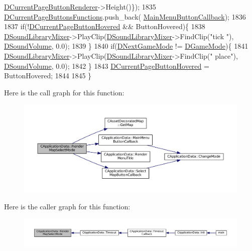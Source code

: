 \begin{DoxyCode}
      \hyperlink{classCApplicationData_abfe1743f2634b069ccc811db4a8733a8}{DCurrentPageButtonRenderer}->Height()\});
1835     \hyperlink{classCApplicationData_ad3079e5563a19d21c1e4ceff2a188382}{DCurrentPageButtonsFunctions}.push\_back(
      \hyperlink{classCApplicationData_a4410839118b5b74dab798ad7be6f703b}{MainMenuButtonCallback});
1836     
1837     \textcolor{keywordflow}{if}(!\hyperlink{classCApplicationData_a96b3a9b5c9965540007dff3fa85587fa}{DCurrentPageButtonHovered} && ButtonHovered)\{
1838         \hyperlink{classCApplicationData_aa1e6876121bb4fb229ec6b930a8a6766}{DSoundLibraryMixer}->PlayClip(\hyperlink{classCApplicationData_aa1e6876121bb4fb229ec6b930a8a6766}{DSoundLibraryMixer}->FindClip(\textcolor{stringliteral}{"tick
      "}), \hyperlink{classCApplicationData_aa6e540f860dcb1929ef36ddce3be3691}{DSoundVolume}, 0.0);
1839     \}
1840     \textcolor{keywordflow}{if}(\hyperlink{classCApplicationData_a3b67edeacd70201dcf96fa9fa8aa2107}{DNextGameMode} != \hyperlink{classCApplicationData_a2f906f2b4208ecb2a057e6b62e549685}{DGameMode})\{
1841         \hyperlink{classCApplicationData_aa1e6876121bb4fb229ec6b930a8a6766}{DSoundLibraryMixer}->PlayClip(\hyperlink{classCApplicationData_aa1e6876121bb4fb229ec6b930a8a6766}{DSoundLibraryMixer}->FindClip(\textcolor{stringliteral}{"
      place"}), \hyperlink{classCApplicationData_aa6e540f860dcb1929ef36ddce3be3691}{DSoundVolume}, 0.0);
1842     \}
1843     \hyperlink{classCApplicationData_a96b3a9b5c9965540007dff3fa85587fa}{DCurrentPageButtonHovered} = ButtonHovered;
1844 
1845 \}
\end{DoxyCode}
Here is the call graph for this function\+:\nopagebreak
\begin{figure}[H]
\begin{center}
\leavevmode
\includegraphics[width=350pt]{classCApplicationData_a72fff3a266be49b3e9f323dcfe545923_cgraph}
\end{center}
\end{figure}
Here is the caller graph for this function\+:\nopagebreak
\begin{figure}[H]
\begin{center}
\leavevmode
\includegraphics[width=350pt]{classCApplicationData_a72fff3a266be49b3e9f323dcfe545923_icgraph}
\end{center}
\end{figure}
